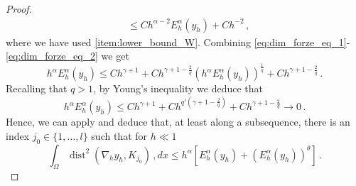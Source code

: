 \documentclass[10pt,a4paper]{amsart}
\DeclareMathOperator{\dist}{dist}
\begin{document}
\begin{proof}
\begin{equation}
\begin{aligned}
		& \leq Ch^{\alpha-2} E_h^\alpha(y_h) + Ch^{-2} \,,
		\end{aligned}
	\end{equation}
	where we have used \ref{item:lower_bound_W}. 
	Combining \eqref{eq:dim_forze_eq_1}-\eqref{eq:dim_forze_eq_2} we get
	\[
	h^\alpha E_h^\alpha(y_h) \leq Ch^{\gamma + 1} + Ch^{\gamma+1 - \frac{2}{q}}(h^\alpha E_h^\alpha(y_h))^{\frac{1}{q}}  +Ch^{\gamma + 1 - \frac{2}{q}} \,.
	\]
	Recalling that $q > 1$, by Young's inequality we deduce that
	\[
	h^\alpha E_h^\alpha(y_h) \leq Ch^{\gamma +1} + Ch^{q'(\gamma + 1 - \frac{2}{q})} + Ch^{\gamma + 1 - \frac{2}{q}} \to 0\,.
	\]
	Hence, we can apply  and deduce that, at least along a subsequence, there is an index $j_0 \in \{1, \dots, l\}$ such that for $h \ll 1$
	\[
	\int_\Omega \dist^{2}(\nabla_h y_h, K_{j_0}) \,, dx \leq h^{\alpha}[E_h^{\alpha}(y_h) + (E_h^{\alpha}(y_h))^\theta] \,.
	\]


\end{proof}
\end{document}

